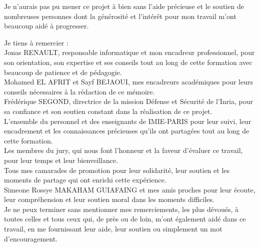 Je n'aurais pas pu mener ce projet à bien sans l'aide précieuse et le soutien de nombreuses personnes dont la générosité et l'intérêt pour mon travail m'ont beaucoup aidé à progresser.

\noindent Je tiens à remercier : \\

Jonas RENAULT, responsable informatique et mon encadreur professionnel, pour son orientation, son expertise et ses conseils tout au long de cette formation avec beaucoup de patience et de pédagogie.\\

Mohamed EL AFRIT et Sayf BEJAOUI, mes encadreurs académiques pour leurs conseils nécessaires à la rédaction de ce mémoire.\\

Frédérique SEGOND, directrice de la mission Défense et Sécurité de l’Inria, pour sa confiance et son soutien constant dans la réalisation de ce projet.\\

L’ensemble du personnel et des enseignants de IMIE-PARIS pour leur suivi, leur encadrement et les connaissances précieuses qu'ils ont partagées tout au long de cette formation.\\

Les membres du jury, qui nous font l’honneur et la faveur d’évaluer ce travail, pour leur temps et leur bienveillance.\\

Tous mes camarades de promotion pour leur solidarité, leur soutien et les moments de partage qui ont enrichi cette expérience.\\

Simeone Rossye MAKAHAM GUIAFAING et mes amis proches pour leur écoute, leur compréhension et leur soutien moral dans les moments difficiles.\\

Je ne peux terminer sans mentionner mes remerciements, les plus dévoués, à toutes celles et tous ceux qui, de près ou de loin, m’ont également aidé dans ce travail, en me fournissant leur aide, leur soutien ou simplement un mot d’encouragement.

